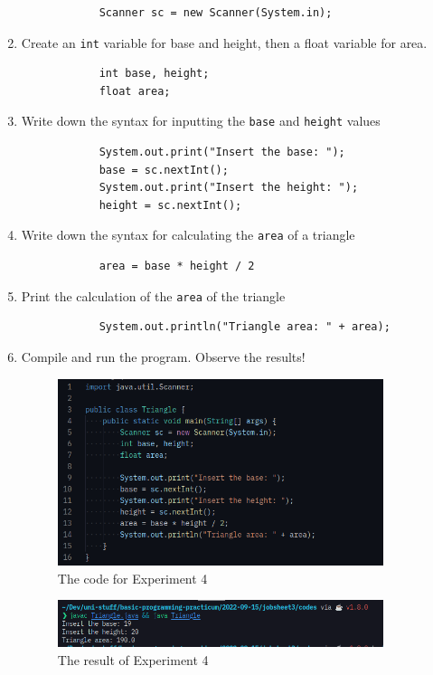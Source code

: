 \documentclass[12pt,titlepage]{article}
\begin{document}
\begin{enumerate}
{\begin{verbatim}
            Scanner sc = new Scanner(System.in);
        \end{verbatim}
    }
    \pagebreak
    \item {
        Create an \texttt{int} variable for base and height, then a float variable for area.
        \begin{verbatim}
            int base, height;
            float area;
        \end{verbatim}
    }
    \item {
        Write down the syntax for inputting the \texttt{base} and \texttt{height} values
        \begin{verbatim}
            System.out.print("Insert the base: ");
            base = sc.nextInt();
            System.out.print("Insert the height: ");
            height = sc.nextInt();
        \end{verbatim}
    }
    \item {
        Write down the syntax for calculating the \texttt{area} of a triangle
        \begin{verbatim}
            area = base * height / 2
        \end{verbatim}
    }
    \item {
        Print the calculation of the \texttt{area} of the triangle
        \begin{verbatim}
            System.out.println("Triangle area: " + area);
        \end{verbatim}
    }
    \item Compile and run the program. Observe the results!
    \begin{figure}[h]
        \centering
        \includegraphics[width=0.9\textwidth]{./images/triangle-code.png}
        \caption{The code for Experiment 4}
    \end{figure}
    \begin{figure}[h]
        \centering
        \includegraphics[width=0.9\textwidth]{./images/triangle-output.png}
        \caption{The result of Experiment 4}
    \end{figure}
\end{enumerate}
\end{document}
